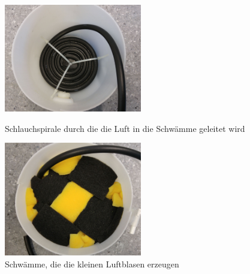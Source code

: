 \begin{figure}[h!]
	\begin{minipage}[hbt]{6cm}
		\centering
		\includegraphics[width=6cm]{Luftbefeuchter_Spirale.jpg}
		\caption[Spirale Luftbefeuchter]{Schlauchspirale durch die die Luft in die Schwämme geleitet wird}
	\end{minipage}
	\hfill
	\begin{minipage}[hbt]{6cm}
		\centering
		\includegraphics[width=6cm]{Luftbefeuchter_Schwaemme.jpg}
		\caption[Schwämme Luftbefeuchter]{Schwämme, die die kleinen Luftblasen erzeugen}
	\end{minipage}
\end{figure}

